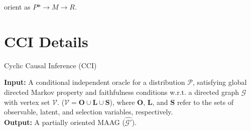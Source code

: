 \documentclass[11pt]{article}
\theoremstyle{definition}
\begin{document}
\begin{appendices}
\begin{algorithm}
\begin{algorithmic}[1]
            \State orient as $P * \rightarrow M \rightarrow R$.
    \EndIf
{}

\end{algorithmic}
\end{algorithm}









\newpage

\section{CCI Details}\label{algCCI}


\begin{algorithm} 
\caption{Cyclic Causal Inference (CCI)}
 \hspace*{\algorithmicindent} \textbf{Input:} A conditional independent oracle for a distribution $\mathcal{P}$, satisfying global directed Markov property and faithfulness conditions w.r.t. a directed graph $\mathcal{G}$ with vertex set $\mathcal{V}$. ($\mathcal{V} = \mathbf{O} \cup \mathbf{L} \cup \mathbf{S}$), where $\mathbf{O}$, $\mathbf{L}$, and $\mathbf{S}$ refer to the sets of observable, latent, and selection variables, respectively.\\
 \hspace*{\algorithmicindent} \textbf{Output:} A partially oriented MAAG ($\mathcal{\hat{G'}}$).



\end{algorithm}
\end{appendices}
\end{document}
